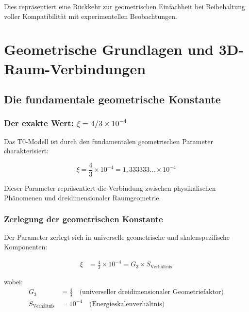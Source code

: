 \documentclass[12pt,a4paper]{report}
\begin{document}
	Dies repräsentiert eine Rückkehr zur geometrischen Einfachheit bei Beibehaltung voller Kompatibilität mit experimentellen Beobachtungen.
	
	\chapter{Geometrische Grundlagen und 3D-Raum-Verbindungen}
	\label{chap:geometric_foundations}
	
	\section{Die fundamentale geometrische Konstante}
	\label{sec:fundamental_geometric_constant}
	
	\subsection{Der exakte Wert: $\xi = 4/3 \times 10^{-4}$}
	\label{subsec:exact_value}
	
	Das T0-Modell ist durch den fundamentalen geometrischen Parameter charakterisiert:
	
	\begin{equation}
		\boxed{\xi = \frac{4}{3} \times 10^{-4} = 1,333333... \times 10^{-4}}
		\label{eq:xi_exact}
	\end{equation}
	
	Dieser Parameter repräsentiert die Verbindung zwischen physikalischen Phänomenen und dreidimensionaler Raumgeometrie.
	
	\subsection{Zerlegung der geometrischen Konstante}
	\label{subsec:decomposition}
	
	Der Parameter zerlegt sich in universelle geometrische und skalenspezifische Komponenten:
	
	\begin{align}
		\xi &= \frac{4}{3} \times 10^{-4} = G_3 \times S_{\text{Verhältnis}}
	\end{align}
	
	wobei:
	\begin{align}
		G_3 &= \frac{4}{3} \quad \text{(universeller dreidimensionaler Geometriefaktor)} \\
		S_{\text{Verhältnis}} &= 10^{-4} \quad \text{(Energieskalenverhältnis)}
	\end{align}
	
\end{document}
